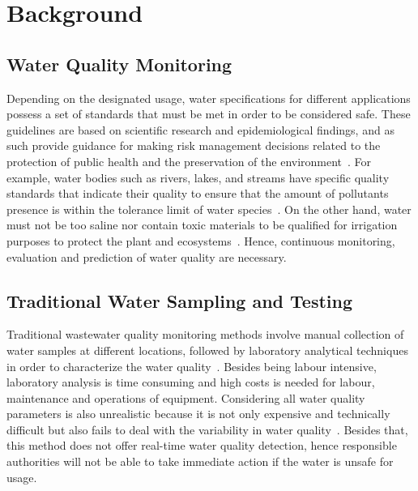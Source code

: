 \documentclass[conference]{IEEEtran}
\begin{document}
\section{Background}    
\subsection{Water Quality Monitoring}
Depending on the designated usage, water specifications for different applications possess a set of standards that must be met in order to be considered safe. These guidelines are based on scientific research and epidemiological findings, and as such provide guidance for making risk management decisions related to the protection of public health and the preservation of the environment~\cite{lee1982water}. For example, water bodies such as rivers, lakes, and streams have specific quality standards that indicate their quality to ensure that the amount of pollutants presence is within the tolerance limit of water species~\cite{aldhyani2020water}. On the other hand, water must not be too saline nor contain toxic materials to 
be qualified for irrigation purposes to protect the plant and ecosystems~\cite{aldhyani2020water}. Hence, continuous monitoring, evaluation and prediction of water quality are necessary. 

\subsection{Traditional Water Sampling and Testing}
Traditional wastewater quality monitoring methods involve manual collection of water samples at different locations, followed by laboratory analytical techniques in order to characterize the water quality~\cite{martinezetal}.
Besides being labour intensive, laboratory analysis is time consuming and high costs is needed for labour, maintenance and operations of equipment. Considering all water quality parameters is also unrealistic because it is not only expensive and technically difficult but also fails to deal with the variability in water quality~\cite{zhu2022review}. Besides that, this method does not offer real-time water quality detection, hence responsible authorities will not be able to take immediate action if the water is unsafe for usage.
\end{document}
